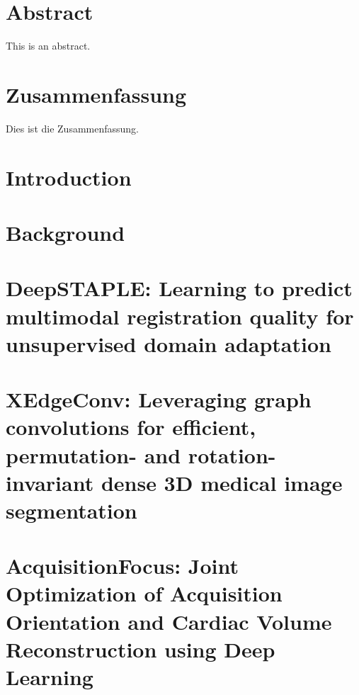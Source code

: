 \documentclass[11pt, a4paper, twoside, headsepline, titlepage, DIV=11, BCOR=12mm, captions=tableheading, chapterprefix=on, numbers=noenddot]{scrbook}
\begin{document}
    \thispagestyle{headings}
    

    \enlargethispage{1\baselineskip}
    \setcounter{page}{1}

    \chapter*{Abstract} %
        This is an abstract.
    \cleardoublepage

    \chapter*{Zusammenfassung} %
        Dies ist die Zusammenfassung.
    \cleardoublepage

    \tableofcontents
    \cleardoublepage

    \chapter{Introduction} %
        

    \chapter{Background} %
        

    \chapter[DeepSTAPLE]{DeepSTAPLE: Learning to predict multimodal registration quality for unsupervised domain adaptation}
        

    \chapter[XEdgeConv]{XEdgeConv: Leveraging graph convolutions for efficient, permutation- and rotation-invariant dense 3D medical image segmentation}
        

    \chapter[AcquisitionFocus]{AcquisitionFocus: Joint Optimization of Acquisition Orientation and Cardiac Volume Reconstruction using Deep Learning}
        
\end{document}
